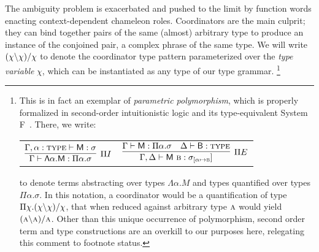 The ambiguity problem is exacerbated and pushed to the limit by function words enacting context-dependent chameleon roles.
Coordinators are the main culprit; they can bind together pairs of the same (almost) arbitrary type to produce an instance of the conjoined pair, a complex phrase of the same type.
We will write $(\chi\backslash\chi)/\chi$ to denote the coordinator type pattern parameterized over the \textit{type variable} $\chi$, which can be instantiated as any type of our type grammar.%
\footnote{
This is in fact an exemplar of \textit{parametric polymorphism}, which is properly formalized in second-order intuitionistic logic and its type-equivalent System F~\cite{girard1972interpretation, reynolds1974towards}. There, we write:
\begin{center}
\begin{tabularx}{0.6\textwidth}{@{}cc@{}}
$\infer[\Pi I]{\Gamma \vdash \term{\Lambda \alpha.M}: \Pi \alpha.\sigma}{\Gamma, \alpha : \prop{TYPE} \vdash \term{M}: \sigma}$
&
$\infer[\Pi E]{\Gamma, \Delta \vdash \term{M~\prop{B}}: \sigma_{[\alpha\mapsto\smallprop{B}}]}{\Gamma \vdash\term{M}: \Pi \alpha.\sigma &  \Delta \vdash \term{B}: \prop{TYPE}}$
\end{tabularx}
\end{center}
to denote terms abstracting over types $\Lambda \alpha.M$ and types quantified over types $\Pi \alpha.\sigma$.
In this notation, a coordinator would be a quantification of type $\Pi\chi.(\chi\backslash\chi)/\chi$, that when reduced against arbitrary type $\smallprop{A}$ would yield $(\smallprop{A}\divleft\smallprop{A})\divright\smallprop{A}$.
Other than this unique occurrence of polymorphism, second order term and type constructions are an overkill to our purposes here, relegating this comment to footnote status.
}

